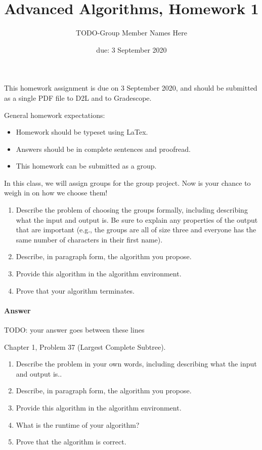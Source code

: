 \documentclass{article}
\title{Advanced Algorithms, Homework 1}
\author{TODO-Group Member Names Here}
\date{due: 3 September 2020}
\begin{document}
\maketitle

This homework assignment is due on 3 September 2020, and should be
submitted as a single PDF file to D2L and to Gradescope.

General homework expectations:
\begin{itemize}
    \item Homework should be typeset using LaTex.
    \item Answers should be in complete sentences and proofread.
    \item This homework can be submitted as a group.
\end{itemize}

\nextprob
{}

In this class, we will assign groups for the group project.  Now is your chance
to weigh in on how we choose them!
\begin{enumerate}
    \item Describe the problem of choosing the groups formally, including
        describing what the input and output is.  Be sure to explain any
        properties of the output that are important (e.g., the groups are all of
        size three and everyone has the same number of characters in their first
        name).
    \item Describe, in paragraph form, the algorithm you propose.
    \item Provide this algorithm in the algorithm environment.
    \item Prove that your algorithm terminates.
\end{enumerate}

\paragraph{Answer}


TODO: your answer goes between these lines


\nextprob
{}

Chapter 1, Problem 37 (Largest Complete Subtree).

\begin{enumerate}
    \item Describe the problem in your own words, including
        describing what the input and output is..
    \item Describe, in paragraph form, the algorithm you propose.
    \item Provide this algorithm in the algorithm environment.
    \item What is the runtime of your algorithm?
    \item Prove that the algorithm is correct.
\end{enumerate}
\end{document}

